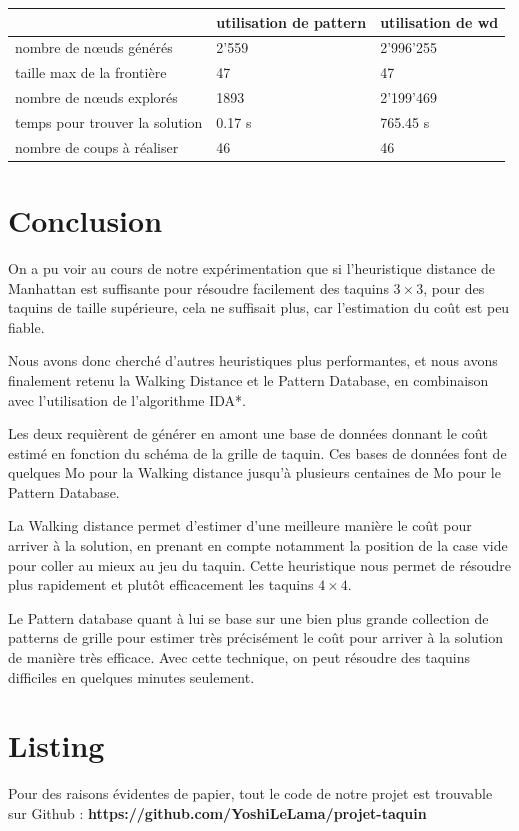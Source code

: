 \documentclass[a4paper, 12pt]{article}
\begin{document}
\begin{tabular}{|l|l|l|}
    \hline
                                   & utilisation de pattern & utilisation de wd \\
    \hline
    nombre de n\oe uds générés     & 2'559                  & 2'996'255         \\
    \hline
    taille max de la frontière     & 47                     & 47                \\
    \hline
    nombre de n\oe uds explorés    & 1893                   & 2'199'469         \\
    \hline
    temps pour trouver la solution & 0.17 s                 & 765.45 s          \\
    \hline
    nombre de coups à réaliser     & 46                     & 46                \\
    \hline
\end{tabular}

\section{Conclusion}
On a pu voir au cours de notre expérimentation que si l'heuristique distance de Manhattan est suffisante pour résoudre facilement des taquins $3 \times 3$, pour des taquins de taille supérieure, cela ne suffisait plus, car l'estimation du coût est peu fiable.

Nous avons donc cherché d'autres heuristiques plus performantes, et nous avons finalement retenu la Walking Distance et le Pattern Database, en combinaison avec l'utilisation de l'algorithme IDA*.

Les deux requièrent de générer en amont une base de données donnant le coût estimé en fonction du schéma de la grille de taquin. Ces bases de données font de quelques Mo pour la Walking distance jusqu'à plusieurs centaines de Mo pour le Pattern Database.

La Walking distance permet d'estimer d'une meilleure manière le coût pour arriver à la solution, en prenant en compte notamment la position de la case vide pour coller au mieux au jeu du taquin. Cette heuristique nous permet de résoudre plus rapidement et plutôt efficacement les taquins $4 \times 4$.

Le Pattern database quant à lui se base sur une bien plus grande collection de patterns de grille pour estimer très précisément le coût pour arriver à la solution de manière très efficace. Avec cette technique, on peut résoudre des taquins difficiles en quelques minutes seulement.

\section{Listing}

Pour des raisons évidentes de papier, tout le code de notre projet est trouvable sur Github : \textbf{https://github.com/YoshiLeLama/projet-taquin}
\end{document}
